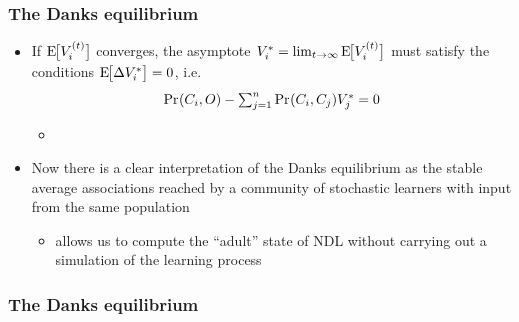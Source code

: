\begin{frame}
  \frametitle{The Danks equilibrium}

  \begin{itemize}
  \item If $\mathrm{E}_{}\!\bigl[V_i^{(t)}\bigr]$ converges, the asymptote $V_i^* = \lim_{t\to \infty} \mathrm{E}_{}\!\bigl[V_i^{(t)}\bigr]$ must satisfy the  conditions $\mathrm{E}_{}\!\bigl[\Delta V_i^*\bigr] = 0$, i.e.
    \[
    \mathop{\mathrm{Pr}_{}}(C_i, O) - \textstyle\sum_{j=1}^n \mathop{\mathrm{Pr}_{}}(C_i, C_j) V_j^* = 0
    \]
    \citep[p.~113]{Danks:03}
    \begin{itemize}
    \item[]
    \end{itemize}
  \item Now there is a clear interpretation of the Danks equilibrium as the stable average associations reached by a community of stochastic learners with input from the same population
    \begin{itemize}
    \item[\hand] allows us to compute the ``adult'' state of NDL without carrying out a simulation of the learning process
    \end{itemize}
  \end{itemize}
\end{frame}

\begin{frame}[c]
  \frametitle{The Danks equilibrium}

  \centering
\end{frame}


